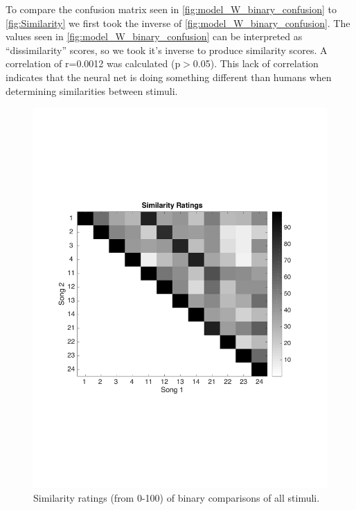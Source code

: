 To compare the confusion matrix seen in \autoref{fig:model_W_binary_confusion} to \autoref{fig:Similarity} we first took the inverse of  \autoref{fig:model_W_binary_confusion}.
The values seen in \autoref{fig:model_W_binary_confusion} can be interpreted as ``dissimilarity'' scores, so we took it's inverse to produce similarity scores. 
A correlation of r=0.0012 was calculated (p$>$0.05).
This lack of correlation indicates that the neural net is doing something different than humans when determining similarities between stimuli. 

\begin{figure}[h] 
  \begin{center}
    \includegraphics[width=\textwidth,keepaspectratio=true]{Figures/Similarity}
    \caption{Similarity ratings (from 0-100) of binary comparisons of all stimuli.}
    \label{fig:Similarity}
  \end{center}
\end{figure}
